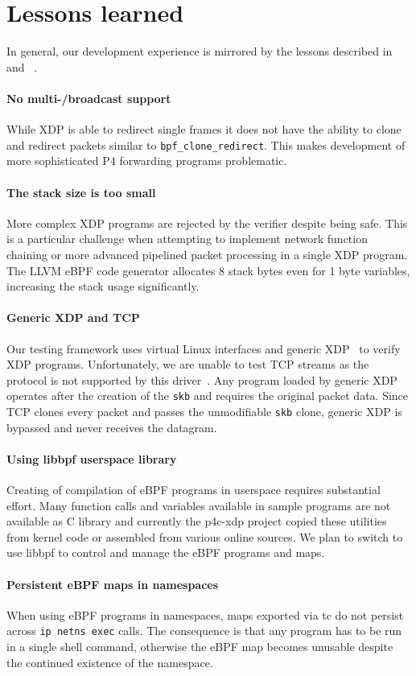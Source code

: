 \section{Lessons learned}\label{sec:conclusions}

In general, our development experience is mirrored by the lessons described
in~\cite{minao-hspr18} and ~\cite{bertin-netdev17}.

\paragraph{No multi-/broadcast support}
While XDP is able to redirect single frames it does not have the ability to
clone and redirect packets similar to \texttt{bpf\_clone\_redirect}. This makes
development of more sophisticated P4 forwarding programs problematic.

\paragraph{The stack size is too small}
More complex XDP programs are rejected by the verifier despite being
safe.  This is a particular challenge when attempting to implement
network function chaining or more advanced pipelined packet processing
in a single XDP program.  The LLVM eBPF code generator allocates 8
stack bytes even for 1 byte variables, increasing the stack usage
significantly.

\paragraph{Generic XDP and TCP}
Our testing framework uses virtual Linux interfaces and generic XDP~\cite{genericxdp}
to verify XDP programs.
Unfortunately, we are unable to test TCP streams as the protocol is not
supported by this driver~\cite{xdptcp}.
Any program loaded by generic XDP operates after the creation of
the \texttt{skb} and requires the original packet data. Since TCP clones every
packet and passes the unmodifiable \texttt{skb} clone,  generic XDP is
bypassed and never receives the datagram.

\paragraph{Using libbpf userspace library}
Creating of compilation of eBPF programs in userspace requires substantial
effort. Many function calls and variables available in sample programs are not
available as C library and currently the p4c-xdp project copied these utilities
from kernel code or assembled from various online sources. We plan to switch to
use libbpf to control and manage the eBPF programs and maps.

\paragraph{Persistent eBPF maps in namespaces}
When using eBPF programs in namespaces, maps exported via tc do not
persist across \texttt{ip netns exec} calls. The consequence is that
any program has to be run in a single shell command, otherwise the
eBPF map becomes unusable despite the continued existence of the
namespace.

